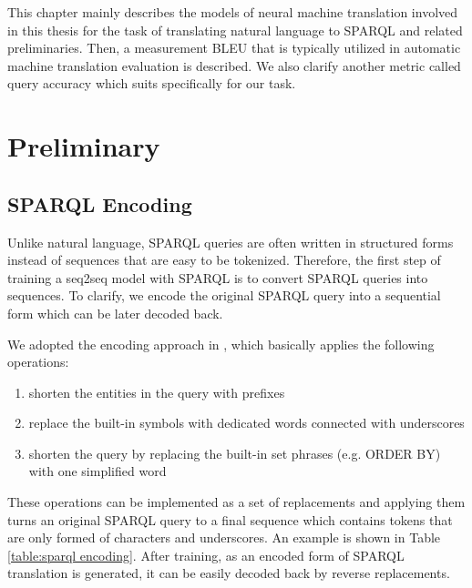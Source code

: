 
This chapter mainly describes the models of neural machine translation involved in this thesis for the task of translating natural language to SPARQL and related preliminaries. Then, a measurement BLEU that is typically utilized in automatic machine translation evaluation is described. We also clarify another metric called query accuracy which suits specifically for our task.

\section{Preliminary}

\subsection{SPARQL Encoding} \label{subsection:preprocessing}

Unlike natural language, SPARQL queries are often written in structured forms instead of sequences that are easy to be tokenized. Therefore, the first step of training a seq2seq model with SPARQL is to convert SPARQL queries into sequences. To clarify, we encode the original SPARQL query into a sequential form which can be later decoded back. 

We adopted the encoding approach in \cite{Soru2018a}, which basically applies the following operations:
\begin{enumerate}
\item shorten the entities in the query with prefixes
\item replace the built-in symbols with dedicated words connected with underscores
\item shorten the query by replacing the built-in set phrases (e.g. ORDER BY) with one simplified word
\end{enumerate}

These operations can be implemented as a set of replacements and applying them turns an original SPARQL query to a final sequence which contains tokens that are only formed of characters and underscores. An example is shown in Table \ref{table:sparql encoding}. After training, as an encoded form of SPARQL translation is generated, it can be easily decoded back by reverse replacements.

